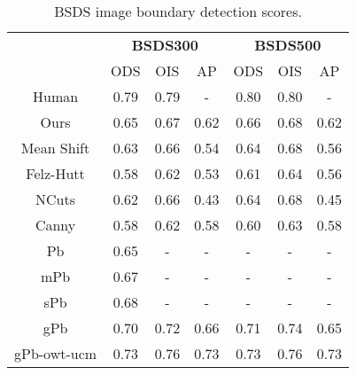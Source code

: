 
\begin{table}[]
\centering
\begin{tabular}{c|c|c|c||c|c|c|}
\cline{2-7}
                                  & \multicolumn{3}{c||}{\textbf{BSDS300}} & \multicolumn{3}{c|}{\textbf{BSDS500}} \\ \cline{2-7} 
                                  & ODS         & OIS        & AP         & ODS         & OIS        & AP         \\ \hline
\multicolumn{1}{|c|}{Human}       & 0.79        & 0.79       & -          & 0.80        & 0.80       & -          \\ \hline
\multicolumn{1}{|c|}{Ours}        & 0.65        & 0.67       & 0.62       & 0.66        & 0.68       & 0.62       \\
\multicolumn{1}{|c|}{Mean Shift}  & 0.63        & 0.66       & 0.54       & 0.64        & 0.68       & 0.56       \\
\multicolumn{1}{|c|}{Felz-Hutt}   & 0.58        & 0.62       & 0.53       & 0.61        & 0.64       & 0.56       \\
\multicolumn{1}{|c|}{NCuts}       & 0.62        & 0.66       & 0.43       & 0.64        & 0.68       & 0.45       \\
\multicolumn{1}{|c|}{Canny}       & 0.58        & 0.62       & 0.58       & 0.60        & 0.63       & 0.58       \\
\multicolumn{1}{|c|}{Pb}          & 0.65        & -          & -          & -           & -          & -          \\ \hline
\multicolumn{1}{|c|}{mPb}         & 0.67        & -          & -          & -           & -          & -          \\
\multicolumn{1}{|c|}{sPb}         & 0.68        & -          & -          & -           & -          & -          \\
\multicolumn{1}{|c|}{gPb}         & 0.70        & 0.72       & 0.66       & 0.71        & 0.74       & 0.65       \\
\multicolumn{1}{|c|}{gPb-owt-ucm} & 0.73        & 0.76       & 0.73       & 0.73        & 0.76       & 0.73       \\ \hline
\end{tabular}
\caption{BSDS image boundary detection scores.}
\label{table:boundary_scores}
\end{table}


